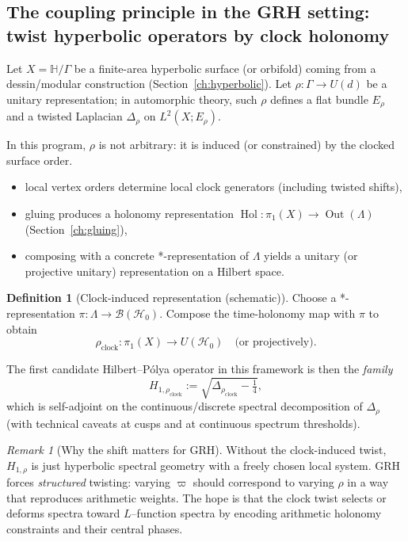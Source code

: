 \documentclass[11pt,oneside]{amsbook}
\numberwithin{equation}{section}
\theoremstyle{plain}
\theoremstyle{definition}
\newtheorem{definition}[theorem]{Definition}
\theoremstyle{remark}
\newtheorem{remark}[theorem]{Remark}
\newcommand{\HH}{\mathbb{H}}
\DeclareMathOperator{\Hol}{\mathrm{Hol}}
\DeclareMathOperator{\Out}{\mathrm{Out}}
\begin{document}
\subsection{The coupling principle in the GRH setting: twist hyperbolic operators by clock holonomy}
\label{sec:coupling_principle_GRH}

Let $X=\HH/\Gamma$ be a finite-area hyperbolic surface (or orbifold) coming from a dessin/modular construction (Section~\ref{ch:hyperbolic}).
Let $\rho:\Gamma\to U(d)$ be a unitary representation; in automorphic theory, such $\rho$ defines a flat bundle $E_\rho$ and a twisted Laplacian $\Delta_\rho$ on $L^2(X;E_\rho)$.

In this program, $\rho$ is not arbitrary: it is induced (or constrained) by the clocked surface order.

\begin{itemize}
\item local vertex orders determine local clock generators (including twisted shifts),
\item gluing produces a holonomy representation $\Hol:\pi_1(X)\to \Out(\Lambda)$ (Section~\ref{ch:gluing}),
\item composing with a concrete *-representation of $\Lambda$ yields a unitary (or projective unitary) representation on a Hilbert space.
\end{itemize}

\begin{definition}[Clock-induced representation (schematic)]
Choose a *-representation $\pi:\Lambda\to \mathcal{B}(\mathcal{H}_0)$.
Compose the time-holonomy map with $\pi$ to obtain
\[
\rho_{\mathrm{clock}}:\pi_1(X)\to U(\mathcal{H}_0)\quad\text{(or projectively)}.
\]
\end{definition}

The first candidate Hilbert--Pólya operator in this framework is then the \emph{family}
\begin{equation}
\label{eq:HP_candidate_1_GRH}
H_{1,\rho_{\mathrm{clock}}}:=\sqrt{\Delta_{\rho_{\mathrm{clock}}}-\tfrac14},
\end{equation}
which is self-adjoint on the continuous/discrete spectral decomposition of $\Delta_{\rho}$ (with technical caveats at cusps and at continuous spectrum thresholds).

\begin{remark}[Why the shift matters for GRH]
Without the clock-induced twist, $H_{1,\rho}$ is just hyperbolic spectral geometry with a freely chosen local system.
GRH forces \emph{structured} twisting: varying $\varpi$ should correspond to varying $\rho$ in a way that reproduces arithmetic weights.
The hope is that the clock twist selects or deforms spectra toward $L$--function spectra by encoding arithmetic holonomy constraints and their central phases.
\end{remark}
\end{document}
